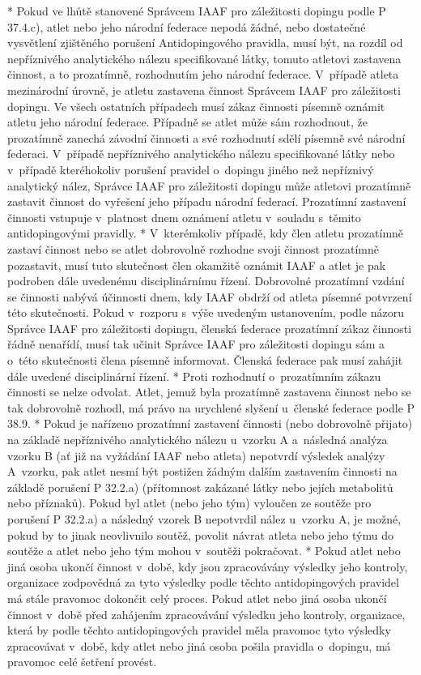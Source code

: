 * Pokud ve lhůtě stanovené Správcem IAAF pro záležitosti dopingu podle P 37.4.c), atlet nebo jeho národní federace nepodá žádné, nebo dostatečné vysvětlení zjištěného porušení Antidopingového pravidla, musí být, na rozdíl od nepříznivého analytického nálezu specifikované látky, tomuto atletovi zastavena činnost, a to prozatímně, rozhodnutím jeho národní federace. V~případě atleta mezinárodní úrovně, je atletu zastavena činnost Správcem IAAF pro záležitosti dopingu. Ve všech ostatních případech musí zákaz činnosti písemně oznámit atletu jeho národní federace. Případně se atlet může sám rozhodnout, že prozatímně zanechá závodní činnosti a své rozhodnutí sdělí písemně své národní federaci. V~případě nepříznivého analytického nálezu specifikované látky nebo v~případě kteréhokoliv porušení pravidel o~dopingu jiného než nepříznivý analytický nález, Správce IAAF pro záležitosti dopingu může atletovi prozatímně zastavit činnost do vyřešení jeho případu národní federací. Prozatímní zastavení činnosti vstupuje v~platnost dnem oznámení atletu v~souladu s~těmito antidopingovými pravidly.
* V~kterémkoliv případě, kdy člen atletu prozatímně zastaví činnost nebo se atlet dobrovolně rozhodne svoji činnost prozatímně pozastavit, musí tuto skutečnost člen okamžitě oznámit IAAF a atlet je pak podroben dále uvedenému disciplinárnímu řízení. Dobrovolné prozatímní vzdání se činnosti nabývá účinnosti dnem, kdy IAAF obdrží od atleta písemné potvrzení této skutečnosti. Pokud v~rozporu s~výše uvedeným ustanovením, podle názoru Správce IAAF pro záležitosti dopingu, členská federace prozatímní zákaz činnosti řádně nenařídí, musí tak učinit Správce IAAF pro záležitosti dopingu sám a o~této skutečnosti člena písemně informovat. Členská federace pak musí zahájit dále uvedené disciplinární řízení.
* Proti rozhodnutí o~prozatímním zákazu činnosti se nelze odvolat. Atlet, jemuž byla prozatímně zastavena činnost nebo se tak dobrovolně rozhodl, má právo na urychlené slyšení u~členské federace podle P 38.9.
* Pokud je nařízeno prozatímní zastavení činnosti (nebo dobrovolně přijato) na základě nepříznivého analytického nálezu u~vzorku A a~následná analýza vzorku B (ať již na vyžádání IAAF nebo atleta) nepotvrdí výsledek analýzy A~vzorku, pak atlet nesmí být postižen žádným dalším zastavením činnosti na základě porušení P 32.2.a) (přítomnost zakázané látky nebo jejích metabolitů nebo příznaků). Pokud byl atlet (nebo jeho tým) vyloučen ze soutěže pro porušení P 32.2.a) a následný vzorek B nepotvrdil nález u~vzorku A, je možné, pokud by to jinak neovlivnilo soutěž, povolit návrat atleta nebo jeho týmu do soutěže a atlet nebo jeho tým mohou v~soutěži pokračovat.
* Pokud atlet nebo jiná osoba ukončí činnost v~době, kdy jsou zpracovávány výsledky jeho kontroly, organizace zodpovědná za tyto výsledky podle těchto antidopingových pravidel má stále pravomoc dokončit celý proces. Pokud atlet nebo jiná osoba ukončí činnost v~době před zahájením zpracovávání výsledku jeho kontroly, organizace, která by podle těchto antidopingových pravidel měla pravomoc tyto výsledky zpracovávat v~době, kdy atlet nebo jiná osoba pošila pravidla o~dopingu, má pravomoc celé šetření provést.

